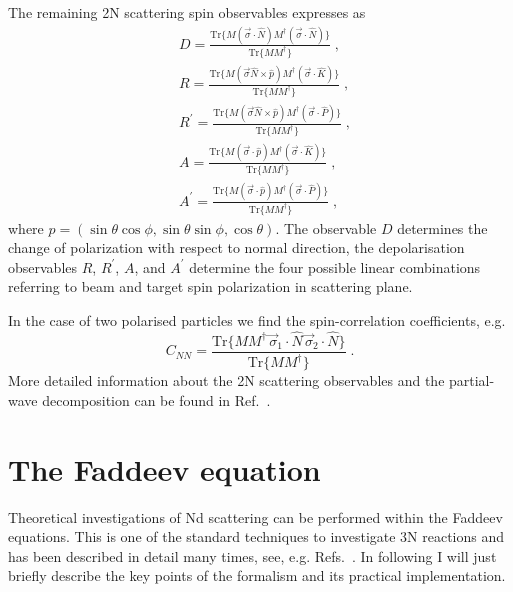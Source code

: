 The remaining 2N scattering spin observables expresses as
\begin{equation}
\begin{split}
&D = \frac{\mathrm{Tr}\lbrace M(\vec{\sigma}\cdot\hat{N})M^{\dagger}(\vec{\sigma}\cdot\hat{N})\rbrace}{\mathrm{Tr}\lbrace MM^{\dagger}\rbrace}\;,\\
&R = \frac{\mathrm{Tr}\lbrace M(\vec{\sigma}\hat{N}\times \hat{p})M^{\dagger}(\vec{\sigma}\cdot\hat{K})\rbrace}{\mathrm{Tr}\lbrace MM^{\dagger}\rbrace}\;,\\
&R^{\prime} = \frac{\mathrm{Tr}\lbrace M(\vec{\sigma}\hat{N}\times \hat{p})M^{\dagger}(\vec{\sigma}\cdot\hat{P})\rbrace}{\mathrm{Tr}\lbrace MM^{\dagger}\rbrace}\;,\\
&A = \frac{\mathrm{Tr}\lbrace M(\vec{\sigma}\cdot\hat{p})M^{\dagger}(\vec{\sigma}\cdot\hat{K})\rbrace}{\mathrm{Tr}\lbrace MM^{\dagger}\rbrace}\;,\\
&A^{\prime} = \frac{\mathrm{Tr}\lbrace M(\vec{\sigma}\cdot\hat{p})M^{\dagger}(\vec{\sigma}\cdot\hat{P})\rbrace}{\mathrm{Tr}\lbrace MM^{\dagger}\rbrace}\;,
\end{split}
\label{Eq2Nall}
\end{equation}
where $\hat{p} = (\sin\theta\cos\phi, \sin\theta\sin\phi, \cos\theta)$. The observable $D$ determines the change of polarization with respect to normal direction, the depolarisation observables $R$, $R^{\prime}$, $A$, and $A^{\prime}$ determine the four possible linear combinations referring to beam and target spin polarization in scattering plane.

In the case of two polarised particles 
we find the spin-correlation coefficients, e.g.
\begin{equation}
C_{NN} = \frac{\mathrm{Tr}\lbrace MM^{\dagger}\!\vec{\,\sigma}_{1}\cdot\hat{N}\!\vec{\,\sigma}_{2}\cdot\hat{N}\rbrace}{\mathrm{Tr}\lbrace MM^{\dagger}\rbrace}\;.
\label{Eqspincorr}
\end{equation}
More detailed information about the 2N scattering observables and the partial-wave decomposition can be found in Ref.~\cite{glockle1983quantum}.

\section{The Faddeev equation}
\label{FaddeevEq}
Theoretical investigations of Nd scattering can be performed within the Faddeev equations. This is one of the standard techniques to investigate 3N reactions and has been described in detail many times, see, e.g. Refs.~\cite{Witaa2001, Glockle1996, glockle1983quantum}. In following I will just briefly describe the key points of the formalism and its practical implementation.

